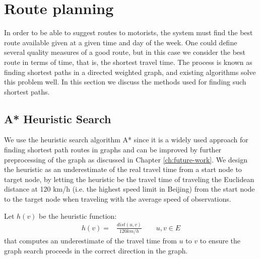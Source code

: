 \section{Route planning}
In order to be able to suggest routes to motorists, the system must find the best route available given at a given time and day of the week. One could define several quality measures of a good route, but in this case we consider the best route in terms of time, that is, the shortest travel time. The process is known as finding shortest paths in a directed weighted graph, and existing algorithms solve this problem well. In this section we discuss the methods used for finding such shortest paths.

\subsection{A* Heuristic Search}\label{sec:pathfinding}
We use the heuristic search algorithm A* since it is a widely used approach for finding shortest path routes in graphs and can be improved by further preprocessing of the graph as discussed in Chapter \ref{ch:future-work}.
We design the heuristic as an underestimate of the real travel time from a start node to target node, by letting the heuristic be the travel time of traveling the Euclidean distance at 120 km/h (i.e. the highest speed limit in Beijing) from the start node to the target node when traveling with the average speed of observations.

Let $h(v)$ be the heuristic function:
\begin{align*}
h(v) = &\frac{dist(u,v)}{120 km/h} \qquad u,v \in E
\end{align*}
that computes an underestimate of the travel time from $u$ to $v$ to ensure the graph search proceeds in the correct direction in the graph.

